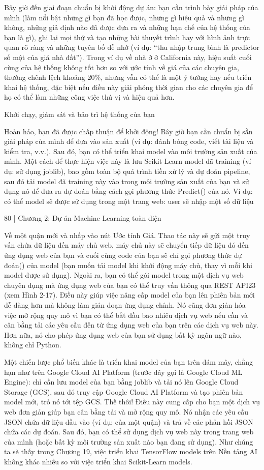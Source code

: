 Bây giờ đến giai đoạn chuẩn bị khởi động dự án: bạn cần trình bày giải pháp của mình (làm nổi bật những gì bạn đã học được, những gì hiệu quả và những gì không, những giả định nào đã được đưa ra và những hạn chế của hệ thống của bạn là gì), ghi lại mọi thứ và tạo những bài thuyết trình hay với hình ảnh trực quan rõ ràng và những tuyên bố dễ nhớ (ví dụ: “thu nhập trung bình là predictor số một của giá nhà đất”). Trong ví dụ về nhà ở ở California này, hiệu suất cuối cùng của hệ thống không tốt hơn so với ước tính về giá của các chuyên gia, thường chênh lệch khoảng 20\%, nhưng vẫn có thể là một ý tưởng hay nếu triển khai hệ thống, đặc biệt nếu điều này giải phóng thời gian cho các chuyên gia để họ có thể làm những công việc thú vị và hiệu quả hơn.

Khởi chạy, giám sát và bảo trì hệ thống của bạn

Hoàn hảo, bạn đã được chấp thuận để khởi động! Bây giờ bạn cần chuẩn bị sẵn giải pháp của mình để đưa vào sản xuất (ví dụ: đánh bóng code, viết tài liệu và kiểm tra, v.v.). Sau đó, bạn có thể triển khai model vào môi trường sản xuất của mình. Một cách để thực hiện việc này là lưu Scikit-Learn model đã training (ví dụ: sử dụng joblib), bao gồm toàn bộ quá trình tiền xử lý và dự đoán pipeline, sau đó tải model đã training này vào trong môi trường sản xuất của bạn và sử dụng nó để đưa ra dự đoán bằng cách gọi phương thức Predict() của nó. Ví dụ: có thể model sẽ được sử dụng trong một trang web: user sẽ nhập một số dữ liệu

80 | Chương 2: Dự án Machine Learning toàn diện

Về một quận mới và nhấp vào nút Ước tính Giá. Thao tác này sẽ gửi một truy vấn chứa dữ liệu đến máy chủ web, máy chủ này sẽ chuyển tiếp dữ liệu đó đến ứng dụng web của bạn và cuối cùng code của bạn sẽ chỉ gọi phương thức dự đoán() của model (bạn muốn tải model khi khởi động máy chủ, thay vì mỗi khi model được sử dụng). Ngoài ra, bạn có thể gói model trong một dịch vụ web chuyên dụng mà ứng dụng web của bạn có thể truy vấn thông qua REST API23 (xem Hình 2-17). Điều này giúp việc nâng cấp model của bạn lên phiên bản mới dễ dàng hơn mà không làm gián đoạn ứng dụng chính. Nó cũng đơn giản hóa việc mở rộng quy mô vì bạn có thể bắt đầu bao nhiêu dịch vụ web nếu cần và cân bằng tải các yêu cầu đến từ ứng dụng web của bạn trên các dịch vụ web này. Hơn nữa, nó cho phép ứng dụng web của bạn sử dụng bất kỳ ngôn ngữ nào, không chỉ Python.

Một chiến lược phổ biến khác là triển khai model của bạn trên đám mây, chẳng hạn như trên Google Cloud AI Platform (trước đây gọi là Google Cloud ML Engine): chỉ cần lưu model của bạn bằng joblib và tải nó lên Google Cloud Storage (GCS), sau đó truy cập Google Cloud AI Platform và tạo phiên bản model mới, trỏ nó tới tệp GCS. Thế thôi! Điều này cung cấp cho bạn một dịch vụ web đơn giản giúp bạn cân bằng tải và mở rộng quy mô. Nó nhận các yêu cầu JSON chứa dữ liệu đầu vào (ví dụ: của một quận) và trả về các phản hồi JSON chứa các dự đoán. Sau đó, bạn có thể sử dụng dịch vụ web này trong trang web của mình (hoặc bất kỳ môi trường sản xuất nào bạn đang sử dụng). Như chúng ta sẽ thấy trong Chương 19, việc triển khai TensorFlow models trên Nền tảng AI không khác nhiều so với việc triển khai Scikit-Learn models.

